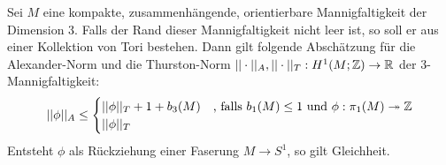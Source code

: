     \begin{thm}[McMullen]
    \label{thm:haupttheorem}
    	Sei $M$ eine kompakte, zusammenhängende, orientierbare Mannigfaltigkeit der Dimension 3. Falls der Rand dieser Mannigfaltigkeit nicht leer ist, so soll er aus einer Kollektion von Tori bestehen. Dann gilt folgende Abschätzung für die Alexander-Norm und die Thurston-Norm $||\cdot||_A ,||\cdot||_T : H^1(M;\mathbb{Z}) \to \mathbb{R}$ der 3-Mannigfaltigkeit:
    	\[
    		||\phi||_A \leq 
    		\begin{cases}
    			||\phi||_T + 1+ b_3(M) &\text{, falls } b_1(M)\leq 1 \text{ und } \phi: \pi_1(M) \twoheadrightarrow \mathbb{Z} \\
    			||\phi||_T &
    		\end{cases}
    	\]
    	Entsteht $\phi$ als Rückziehung einer Faserung $M\to S^1$, so gilt Gleichheit.
    \end{thm}